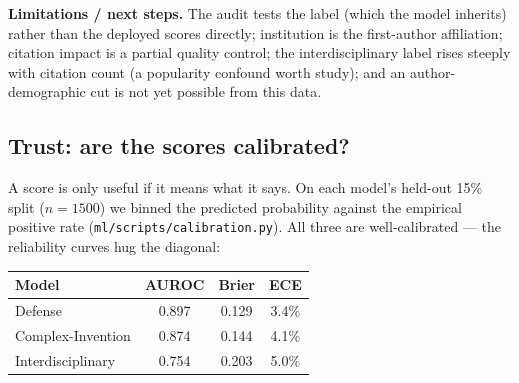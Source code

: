 \documentclass[11pt]{article}
\begin{document}
\textbf{Limitations / next steps.} The audit tests the label (which the model
inherits) rather than the deployed scores directly; institution is the first-author
affiliation; citation impact is a partial quality control; the interdisciplinary
label rises steeply with citation count (a popularity confound worth study); and an
author-demographic cut is not yet possible from this data.

\subsection*{Trust: are the scores calibrated?}
A score is only useful if it means what it says. On each model's held-out 15\%
split ($n=1500$) we binned the predicted probability against the empirical positive
rate (\texttt{ml/scripts/calibration.py}). All three are well-calibrated --- the
reliability curves hug the diagonal:

\begin{center}
\end{center}

\begin{center}
\begin{tabular}{@{}lccc@{}}
\toprule
\textbf{Model} & \textbf{AUROC} & \textbf{Brier} & \textbf{ECE} \\
\midrule
Defense & 0.897 & 0.129 & 3.4\% \\
Complex-Invention & 0.874 & 0.144 & 4.1\% \\
Interdisciplinary & 0.754 & 0.203 & 5.0\% \\
\bottomrule
\end{tabular}
\end{center}
\end{document}
